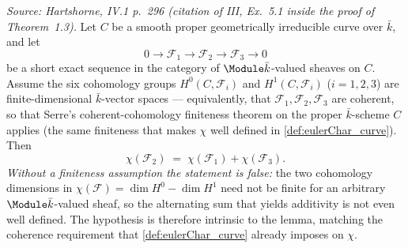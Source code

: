 \begin{lemma}
  \label{lem:euler_char_shortExact_add}
  \textit{Source: Hartshorne, IV.1 p.~296 (citation of III, Ex.~5.1
  inside the proof of Theorem~1.3).}
  Let \(C\) be a smooth proper geometrically irreducible curve over
  \(\bar k\), and let
  \[
    0 \to \mathcal F_1 \to \mathcal F_2 \to \mathcal F_3 \to 0
  \]
  be a short exact sequence in the category of \(\Module \bar k\)-valued
  sheaves on \(C\). Assume the six cohomology groups
  \(H^0(C, \mathcal F_i)\) and \(H^1(C, \mathcal F_i)\) (\(i = 1, 2, 3\))
  are finite-dimensional \(\bar k\)-vector spaces --- equivalently, that
  \(\mathcal F_1, \mathcal F_2, \mathcal F_3\) are coherent, so that
  Serre's coherent-cohomology finiteness theorem on the proper
  \(\bar k\)-scheme \(C\) applies (the same finiteness that makes
  \(\chi\) well defined in \cref{def:eulerChar_curve}). Then
  \[
    \chi(\mathcal F_2) \;=\; \chi(\mathcal F_1) + \chi(\mathcal F_3).
  \]
  \emph{Without a finiteness assumption the statement is false:} the two
  cohomology dimensions in \(\chi(\mathcal F) = \dim H^0 - \dim H^1\) need
  not be finite for an arbitrary \(\Module \bar k\)-valued sheaf, so the
  alternating sum that yields additivity is not even well defined. The
  hypothesis is therefore intrinsic to the lemma, matching the coherence
  requirement that \cref{def:eulerChar_curve} already imposes on \(\chi\).
\end{lemma}

